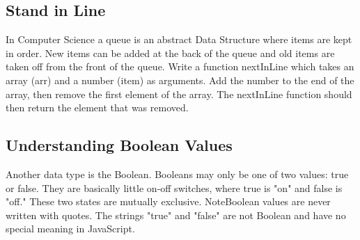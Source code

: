 \documentclass{article}%
\begin{document}
%
\subsection{Stand in Line}%
\label{subsec:StandinLine}%
In Computer Science a queue is an abstract Data Structure where items are kept in order. New items can be added at the back of the queue and old items are taken off from the front of the queue.\newline%
Write a function nextInLine which takes an array (arr) and a number (item) as arguments.\newline%
Add the number to the end of the array, then remove the first element of the array.\newline%
The nextInLine function should then return the element that was removed.\newline%

%
\subsection{Understanding Boolean Values}%
\label{subsec:UnderstandingBooleanValues}%
Another data type is the Boolean. Booleans may only be one of two values: true or false. They are basically little on{-}off switches, where true is "on" and false is "off."  These two states are mutually exclusive.\newline%
NoteBoolean values are never written with quotes. The strings "true" and "false" are not Boolean and have no special meaning in JavaScript.\newline%

%
\end{document}
